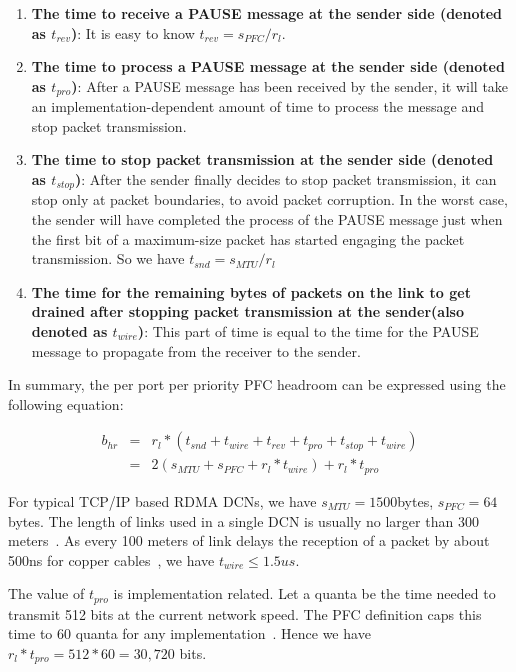 {\begin{enumerate}
\item\textbf{The time to receive a PAUSE message at the sender side (denoted as $t_{rev}$)}: It is easy to know $t_{rev}=s_{PFC}/r_{l}$.

\item\textbf{The time to process a PAUSE message at the sender side (denoted as $t_{pro}$)}:  After a PAUSE message has been received by the sender, it will take an implementation-dependent amount of time to process the message and stop packet transmission.

\item\textbf{The time to stop packet transmission at the sender side (denoted as $t_{stop}$)}: After the sender finally decides to stop packet transmission, it can stop only at packet boundaries, to avoid packet corruption.  In the worst case, the sender will have completed the process of the PAUSE message just when the first bit of a maximum-size packet has started engaging the packet transmission. So we have  $t_{snd}=s_{MTU}/r_{l}$

\item\textbf{The time for the remaining bytes of packets on the link to get drained after stopping packet transmission at the sender(also denoted as $t_{wire}$)}: This part of time is equal to the time for the PAUSE message to propagate from the receiver to the sender.
\end{enumerate}

In summary, the per port per priority PFC headroom can be expressed using the following equation:


\begin{eqnarray} \label{eqn:pfcheadroom}
b_{hr} &=& r_{l}*(t_{snd}+t_{wire}+t_{rev}+t_{pro}+t_{stop}+t_{wire})     \nonumber \\
&=& 2(s_{MTU}+s_{PFC}+r_l*t_{wire})+r_l*t_{pro}
\end{eqnarray}

For typical TCP/IP based RDMA DCNs, we have $s_{MTU}=1500$bytes, $s_{PFC}=64$bytes. The length of links used in a single DCN is usually no larger than 300 meters~\cite{rdmaatscale}. As every 100 meters of link delays the reception of a packet by about 500ns for copper cables~\cite{pfcheadroom}, we have $t_{wire} \leq 1.5us$.

The value of  $t_{pro}$ is implementation related. Let a quanta be the time needed to transmit 512 bits at the current network speed. The PFC definition caps this time to 60 quanta for any implementation~\cite{pfcheadroom}. Hence we have $r_l*t_{pro}=512 * 60 = 30,720 $ bits.

}
